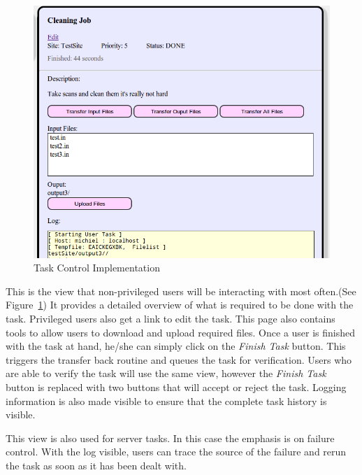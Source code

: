 \begin{description}
\begin{figure}[!h]
\begin{center}
            \includegraphics[scale=0.35]{figures/task_control_impl2.png}
        \end{center}
        \caption{Task Control Implementation}
        \label{task_control_impl2}
    \end{figure}
    This is the view that non-privileged users will be interacting with most often.(See Figure~\ref{task_control_impl2}) It provides
    a detailed overview of what is required to be done with the task. Privileged users also
    get a link to edit the task. This page also contains tools to allow users to download
    and upload required files. Once a user is finished with the task at hand, he/she can
    simply click on the \emph{Finish Task} button. This triggers the transfer back routine
    and queues the task for verification. Users who are able to verify the task will use the
    same view, however the \emph{Finish Task} button is replaced with two buttons that will
    accept or reject the task. Logging information is also made visible to ensure that the
    complete task history is visible.

    This view is also used for server tasks. In this case the emphasis is on failure control.
    With the log visible, users can trace the source of the failure and rerun the task as soon
    as it has been dealt with.


\end{description}
